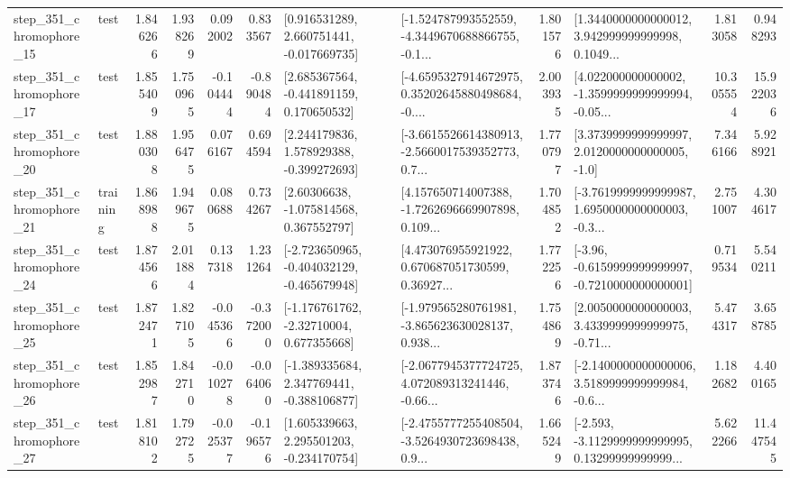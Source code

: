 \begin{tabular}{llrrrrllrlrr}
  step\_351\_chromophore\_15 &      test &      1.846266 &    1.938269 &      0.092002 &  0.833567 &    [0.916531289, 2.660751441, -0.017669735] &  [-1.524787993552559, -4.3449670688866755, -0.1... &       1.801576 &  [1.3440000000000012, 3.942999999999998, 0.1049... &            1.813058 &          0.948293 \\
  step\_351\_chromophore\_17 &      test &      1.855409 &    1.750965 &     -0.104444 & -0.890484 &    [2.685367564, -0.441891159, 0.170650532] &  [-4.6595327914672975, 0.35202645880498684, -0.... &       2.003935 &  [4.022000000000002, -1.3599999999999994, -0.05... &           10.305554 &         15.922036 \\
  step\_351\_chromophore\_20 &      test &      1.880308 &    1.956475 &      0.076167 &  0.694594 &    [2.244179836, 1.578929388, -0.399272693] &  [-3.6615526614380913, -2.5660017539352773, 0.7... &       1.770797 &     [3.3739999999999997, 2.0120000000000005, -1.0] &            7.346166 &          5.928921 \\
  step\_351\_chromophore\_21 &  training &      1.868988 &    1.949675 &      0.080688 &  0.734267 &     [2.60306638, -1.075814568, 0.367552797] &  [4.157650714007388, -1.7262696669907898, 0.109... &       1.704852 &  [-3.7619999999999987, 1.6950000000000003, -0.3... &            2.751007 &          4.304617 \\
  step\_351\_chromophore\_24 &      test &      1.874566 &    2.011884 &      0.137318 &  1.231264 &  [-2.723650965, -0.404032129, -0.465679948] &  [4.473076955921922, 0.670687051730599, 0.36927... &       1.772256 &  [-3.96, -0.6159999999999997, -0.7210000000000001] &            0.719534 &          5.540211 \\
  step\_351\_chromophore\_25 &      test &      1.872471 &    1.827105 &     -0.045366 & -0.372000 &    [-1.176761762, -2.32710004, 0.677355668] &  [-1.979565280761981, -3.865623630028137, 0.938... &       1.754869 &  [2.0050000000000003, 3.4339999999999975, -0.71... &            5.474317 &          3.658785 \\
  step\_351\_chromophore\_26 &      test &      1.852987 &    1.842710 &     -0.010278 & -0.064060 &   [-1.389335684, 2.347769441, -0.388106877] &  [-2.0677945377724725, 4.072089313241446, -0.66... &       1.873746 &  [-2.1400000000000006, 3.5189999999999984, -0.6... &            1.182682 &          4.400165 \\
  step\_351\_chromophore\_27 &      test &      1.818102 &    1.792725 &     -0.025377 & -0.196576 &    [1.605339663, 2.295501203, -0.234170754] &  [-2.4755777255408504, -3.5264930723698438, 0.9... &       1.665249 &  [-2.593, -3.1129999999999995, 0.13299999999999... &            5.622266 &         11.447545 \\

\end{tabular}

